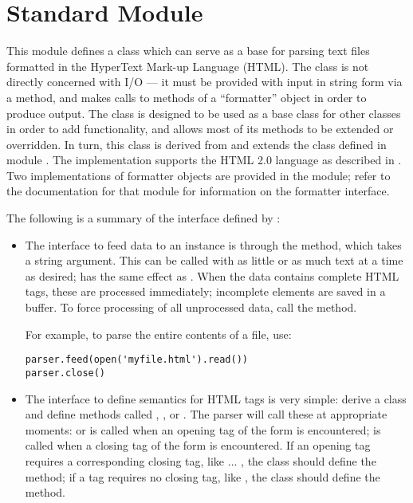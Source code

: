 \section{Standard Module }
\label{module-htmllib}

\renewcommand{\indexsubitem}{(in module htmllib)}

This module defines a class which can serve as a base for parsing text
files formatted in the HyperText Mark-up Language (HTML).  The class
is not directly concerned with I/O --- it must be provided with input
in string form via a method, and makes calls to methods of a
``formatter'' object in order to produce output.  The
 class is designed to be used as a base class for
other classes in order to add functionality, and allows most of its
methods to be extended or overridden.  In turn, this class is derived
from and extends the  class defined in module
.  The 
implementation supports the HTML 2.0 language as described in
.  Two implementations of formatter objects are provided in
the  module; refer to the
documentation for that module for information on the formatter
interface.

The following is a summary of the interface defined by
:

\begin{itemize}

\item
The interface to feed data to an instance is through the 
method, which takes a string argument.  This can be called with as
little or as much text at a time as desired;  has the same effect as .  When the data
contains complete HTML tags, these are processed immediately;
incomplete elements are saved in a buffer.  To force processing of all
unprocessed data, call the  method.

For example, to parse the entire contents of a file, use:
\bcode\begin{verbatim}
parser.feed(open('myfile.html').read())
parser.close()
\end{verbatim}\ecode
%
\item
The interface to define semantics for HTML tags is very simple: derive
a class and define methods called ,
, or .  The parser will
call these at appropriate moments:  or
 is called when an opening tag of the form
 is encountered;  is called
when a closing tag of the form  is encountered.  If
an opening tag requires a corresponding closing tag, like 
... , the class should define the 
method; if a tag requires no closing tag, like , the class
should define the  method.

\end{itemize}

